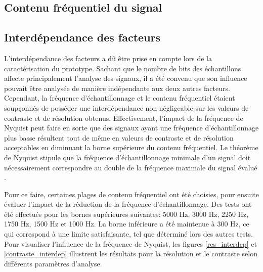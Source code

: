﻿\documentclass[11pt,letterpaper]{article}
\begin{document}
\subsection{Contenu fréquentiel du signal}




\subsection{Interdépendance des facteurs}
L'interdépendance des facteurs a dû être prise en compte lors de la caractérisation du prototype. Sachant que le nombre
de bits des échantillons affecte principalement l'analyse des signaux, il a été convenu que son influence pouvait être analysée
de manière indépendante aux deux autres facteurs. Cependant, la fréquence d'échantillonnage et le contenu fréquentiel étaient soupçonnés
de posséder une interdépendance non négligeable sur les valeurs de contraste et de résolution obtenus. Effectivement, l'impact de la fréquence
de Nyquist peut faire en sorte que des signaux ayant une fréquence d'échantillonnage plus basse résultent tout de même  en valeurs de contraste et de résolution acceptables en diminuant la borne supérieure du contenu fréquentiel. Le théorème de Nyquist stipule que la fréquence d'échantillonnage
minimale d'un signal doit nécessairement correspondre au double de la fréquence maximale du signal évalué \cite{nyquist}. 

Pour ce faire, certaines plages de contenu fréquentiel ont été choisies, pour ensuite évaluer l'impact de la réduction de la fréquence 
d'échantillonnage. Des tests ont été effectués pour les bornes supérieures suivantes: 5000 Hz, 3000 Hz, 2250 Hz, 1750 Hz, 1500 Hz et 1000 Hz.
La borne inférieure a été maintenue à 300 Hz, ce qui correspond à une limite satisfaisante, tel que déterminé lors des autres tests. Pour visualiser
l'influence de la fréquence de Nyquist, les figures \ref{res_interdep} et \ref{contraste_interdep} illustrent les résultats pour la résolution et le contraste selon différents paramètres d'analyse.
\end{document}
